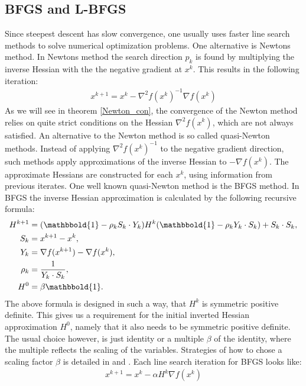 \subsection{BFGS and L-BFGS}
Since steepest descent has slow convergence, one usually uses faster line search methods to solve numerical optimization problems. One alternative is Newtons method. In Newtons method the search direction $p_k$ is found by multiplying the inverse Hessian with the the negative gradient at $x^k$. This results in the following iteration:
\begin{align}
x^{k+1} = x^k - \nabla^2 f(x^k)^{-1}\nabla f(x^k) \label{Newton}
\end{align}
As we will see in theorem \ref{Newton_con}, the convergence of the Newton method relies on quite strict conditions on the Hessian $\nabla^2 f(x^k)$, which are not always satisfied. An alternative to the Newton method is so called quasi-Newton methods. Instead of applying $\nabla^2 f(x^k)^{-1}$ to the negative gradient direction, such methods apply approximations of the inverse Hessian to $-\nabla f(x^k)$. The approximate Hessians are constructed for each $x^k$, using information from previous iterates. One well known quasi-Newton method is the BFGS method\cite{broyden1970convergence, fletcher1970new, goldfarb1970family, shanno1970conditioning}. In BFGS the inverse Hessian approximation is calculated by the following recursive formula:
\begin{align}
H^{k+1} &= (\mathbbold{1}-\rho_kS_k\cdot Y_k)H^k(\mathbbold{1} -\rho_kY_k\cdot S_k) + S_k\cdot S_k, \label{inv_H_apr} \\
S_k &= x^{k+1}-x^{k}, \\
Y_k &= \nabla f(x^{k+1})-\nabla f(x^{k}),\\
\rho_k &= \frac{1}{Y_k\cdot S_k}, \\
H^0&=\beta\mathbbold{1}.
\end{align}
The above formula is designed in such a way, that $H^k$ is symmetric positive definite. This gives us a requirement for the initial inverted Hessian approximation $H^0$, namely that it also needs to be symmetric positive definite. The usual choice however, is just identity or a multiple $\beta$ of the identity, where the multiple reflects the scaling of the variables. Strategies of how to chose a scaling factor $\beta$ is detailed in \cite{liu1989limited} and  \cite{gilbert1989some}. Each line search iteration for BFGS looks like:
\begin{align}
x^{k+1} = x^k - \alpha H^{k}\nabla f(x^k) \label{BFGS_itr}
\end{align} 
